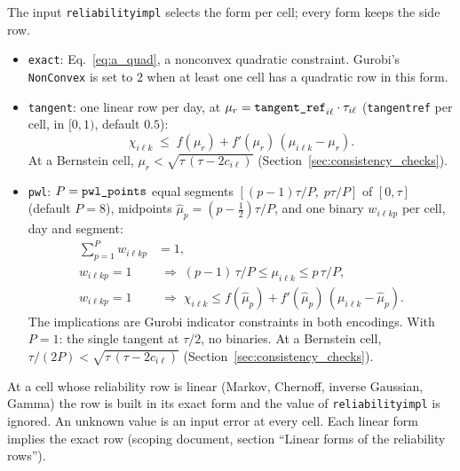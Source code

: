 \documentclass[11pt,a4paper]{article}
\theoremstyle{plain}
\theoremstyle{definition}
\renewcommand{\_}{\textunderscore\allowbreak{}}
\begin{document}
The input \texttt{reliability\_impl} selects the form per cell; every form keeps the
side row.
\begin{itemize}[leftmargin=1.5em]
  \item \texttt{exact}: Eq.~\eqref{eq:a_quad}, a nonconvex quadratic constraint.
        Gurobi's \texttt{NonConvex} is set to $2$ when at least one cell has a
        quadratic row in this form.
  \item \texttt{tangent}: one linear row per day, at
        $\mu_r = \texttt{tangent\_ref}_{i\ell}\cdot\tau_{i\ell}$ (\texttt{tangent\_ref}
        per cell, in $[0, 1)$, default $0.5$):
        \begin{equation}
          \chi_{i\ell k} \;\leq\; f(\mu_r) + f'(\mu_r)\,(\mu_{i\ell k} - \mu_r).
          \label{eq:a_tangent}
        \end{equation}
        At a Bernstein cell, $\mu_r < \sqrt{\tau\,(\tau - 2c_{i\ell})}$
        (Section~\ref{sec:consistency_checks}).
  \item \texttt{pwl}: $P = \texttt{pwl\_points}$ equal segments
        $[(p-1)\tau/P,\; p\tau/P]$ of $[0, \tau]$ (default $P = 8$), midpoints
        $\hat\mu_p = (p - \tfrac12)\tau/P$, and one binary $w_{i\ell kp}$ per cell,
        day and segment:
        \begin{align}
          \textstyle\sum_{p=1}^{P} w_{i\ell kp} &= 1, \label{eq:a_pwl_sum} \\
          w_{i\ell kp} = 1 &\;\Rightarrow\;
            (p-1)\,\tau/P \leq \mu_{i\ell k} \leq p\,\tau/P, \label{eq:a_pwl_seg} \\
          w_{i\ell kp} = 1 &\;\Rightarrow\;
            \chi_{i\ell k} \leq f(\hat\mu_p) + f'(\hat\mu_p)\,(\mu_{i\ell k} - \hat\mu_p).
            \label{eq:a_pwl_cap}
        \end{align}
        The implications are Gurobi indicator constraints in both encodings. With
        $P = 1$: the single tangent at $\tau/2$, no binaries. At a Bernstein cell,
        $\tau/(2P) < \sqrt{\tau\,(\tau - 2c_{i\ell})}$
        (Section~\ref{sec:consistency_checks}).
\end{itemize}
At a cell whose reliability row is linear (Markov, Chernoff, inverse Gaussian, Gamma)
the row is built in its exact form and the value of \texttt{reliability\_impl} is
ignored. An unknown value is an input error at every cell. Each linear form implies
the exact row (scoping document, section ``Linear forms of the reliability rows'').

\end{document}
